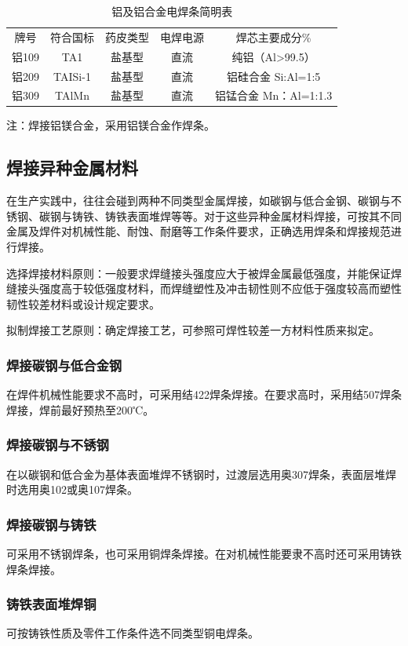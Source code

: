 \documentclass{ctexbook}
\begin{document}
\begin{table}[htbp]
	\centering
	\caption{铝及铝合金电焊条简明表}
	\begin{tabular}{ccccc}
		牌号    & 符合国标  & 药皮类型  & 电焊电源  & 焊芯主要成分\% \\
		铝109  & TA1   & 盐基型   & 直流    & 纯铝（Al>99.5） \\
		铝209  & TAISi-1 & 盐基型   & 直流    & 铝硅合金 Si:Al=1:5 \\
		铝309  & TAlMn & 盐基型   & 直流    & 铝锰合金 Mn：Al=1:1.3 \\
	\end{tabular}%
	\label{tab:lvhejin}%
\end{table}%
注：焊接铝镁合金，采用铝镁合金作焊条。
\subsection{焊接异种金属材料}
在生产实践中，往往会碰到两种不同类型金属焊接，如碳钢与低合金钢、碳钢与不锈钢、碳钢与铸铁、铸铁表面堆焊等等。对于这些异种金属材料焊接，可按其不同金属及焊件对机械性能、耐蚀、耐磨等工作条件要求，正确选用焊条和焊接规范进行焊接。

选择焊接材料原则：一般要求焊缝接头强度应大于被焊金属最低强度，并能保证焊缝接头强度高于较低强度材料，而焊缝塑性及冲击韧性则不应低于强度较高而塑性韧性较差材料或设计规定要求。

拟制焊接工艺原则：确定焊接工艺，可参照可焊性较差一方材料性质来拟定。
\subsubsection{焊接碳钢与低合金钢}
在焊件机械性能要求不高时，可采用结422焊条焊接。在要求高时，采用结507焊条焊接，焊前最好预热至200℃。
\subsubsection{焊接碳钢与不锈钢}
在以碳钢和低合金为基体表面堆焊不锈钢时，过渡层选用奥307焊条，表面层堆焊时选用奥102或奥107焊条。
\subsubsection{焊接碳钢与铸铁}
可采用不锈钢焊条，也可采用铜焊条焊接。在对机械性能要隶不高时还可采用铸铁焊条焊接。
\subsubsection{铸铁表面堆焊铜}
可按铸铁性质及零件工作条件选不同类型铜电焊条。
\end{document}

